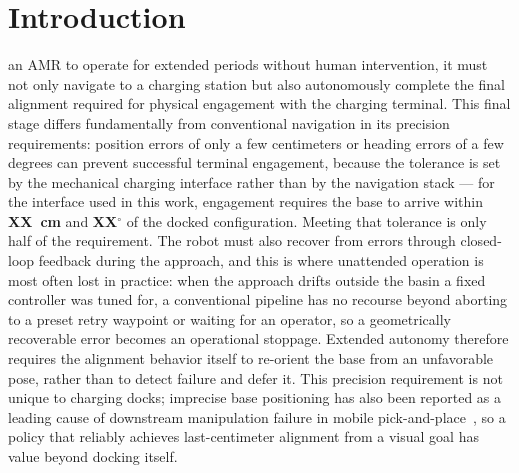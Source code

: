 \documentclass[letterpaper, 10 pt, conference]{IEEEtran}  %
\begin{document}
\section{Introduction}
 an AMR to operate for extended periods without human intervention, it must not only navigate to a charging station but also autonomously complete the final alignment required for physical engagement with the charging terminal. This final stage differs fundamentally from conventional navigation in its precision requirements: position errors of only a few centimeters or heading errors of a few degrees can prevent successful terminal engagement, because the tolerance is set by the mechanical charging interface rather than by the navigation stack --- for the interface used in this work, engagement requires the base to arrive within \textbf{XX~cm} and \textbf{XX}$^\circ$ of the docked configuration. Meeting that tolerance is only half of the requirement. The robot must also recover from errors through closed-loop feedback during the approach, and this is where unattended operation is most often lost in practice: when the approach drifts outside the basin a fixed controller was tuned for, a conventional pipeline has no recourse beyond aborting to a preset retry waypoint or waiting for an operator, so a geometrically recoverable error becomes an operational stoppage. Extended autonomy therefore requires the alignment behavior itself to re-orient the base from an unfavorable pose, rather than to detect failure and defer it. This precision requirement is not unique to charging docks; imprecise base positioning has also been reported as a leading cause of downstream manipulation failure in mobile pick-and-place~\cite{yokoyama2024asc}, so a policy that reliably achieves last-centimeter alignment from a visual goal has value beyond docking itself.
\end{document}
